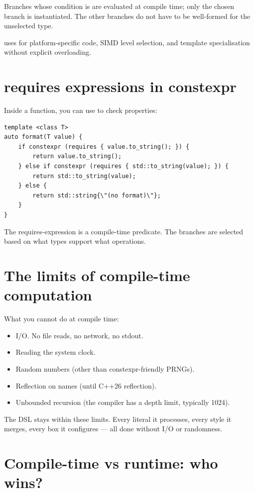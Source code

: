 Branches whose condition is  are evaluated at
compile time; only the chosen branch is instantiated. The other
branches do not have to be well-formed for the unselected type.

\maya{} uses  for platform-specific code,
SIMD level selection, and template specialisation without
explicit overloading.

\section{requires expressions in constexpr}

Inside a function, you can use  to check
properties:

\begin{lstlisting}
template <class T>
auto format(T value) {
    if constexpr (requires { value.to_string(); }) {
        return value.to_string();
    } else if constexpr (requires { std::to_string(value); }) {
        return std::to_string(value);
    } else {
        return std::string{\"(no format)\"};
    }
}
\end{lstlisting}

The requires-expression is a compile-time predicate. The
branches are selected based on what types support what
operations.

\section{The limits of compile-time computation}

What you cannot do at compile time:

\begin{itemize}[leftmargin=*]
  \item I/O. No file reads, no network, no stdout.
  \item Reading the system clock.
  \item Random numbers (other than constexpr-friendly PRNGs).
  \item Reflection on names (until C++26 reflection).
  \item Unbounded recursion (the compiler has a depth limit,
    typically 1024).
\end{itemize}

The DSL stays within these limits. Every literal it processes,
every style it merges, every box it configures --- all done
without I/O or randomness.

\section{Compile-time vs runtime: who wins?}

